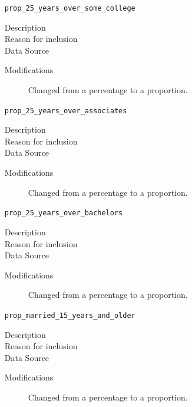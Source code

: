 \documentclass{article}
\begin{document}
\begin{itemize}[label={}, align=left]
\begin{description}
          \end{description}
    \item[\texttt{prop\_25\_years\_over\_some\_college}] \
          \begin{description}
              \item[Description] 
              \item[Reason for inclusion] \educationreason
              \item[Data Source] \cite{acs_education_data}
              \item[Modifications] Changed from a percentage to a proportion.
          \end{description}
    \item[\texttt{prop\_25\_years\_over\_associates}] \
          \begin{description}
              \item[Description] 
              \item[Reason for inclusion] \educationreason
              \item[Data Source] \cite{acs_education_data}
              \item[Modifications] Changed from a percentage to a proportion.
          \end{description}
    \item[\texttt{prop\_25\_years\_over\_bachelors}] \
          \begin{description}
              \item[Description] 
              \item[Reason for inclusion] \educationreason
              \item[Data Source] \cite{acs_education_data}
              \item[Modifications] Changed from a percentage to a proportion.
          \end{description}
    \item[\texttt{prop\_married\_15\_years\_and\_older}] \
          \begin{description}
              \item[Description] \maritaldesc{married}
              \item[Reason for inclusion] \maritalreason
              \item[Data Source] \cite{acs_education_data}
              \item[Modifications] Changed from a percentage to a proportion.

\end{description}
\end{itemize}
\end{document}
